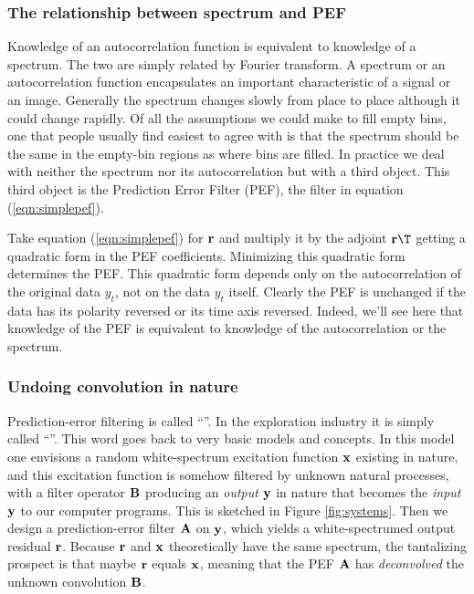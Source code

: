 \subsubsection{The relationship between spectrum and PEF}
Knowledge of an autocorrelation function
is equivalent to knowledge of a spectrum.
The two are simply related by Fourier transform.
A spectrum or an autocorrelation function encapsulates
an important characteristic of a signal or an image.
Generally the spectrum changes slowly from place to place
although it could change rapidly.
Of all the assumptions we could make to fill empty bins,
one that people usually find easiest to agree with is that
the spectrum should be the same
in the empty-bin regions as where bins are filled.
In practice we deal with neither the spectrum
nor its autocorrelation but with a third object.
This third object is the Prediction Error Filter (PEF),
the filter in equation (\ref{eqn:simplepef}).

\par
Take equation  (\ref{eqn:simplepef}) for $\bold r$ and multiply it
by the adjoint $\bold r\T$ getting a quadratic form in the PEF
coefficients.  Minimizing this quadratic form determines the PEF.
This quadratic form depends only on the autocorrelation
of the original data $y_t$, not on the data $y_t$ itself.
Clearly the PEF is unchanged if the data has its polarity reversed
or its time axis reversed.
Indeed, we'll see here that knowledge of the PEF
is equivalent to knowledge of the autocorrelation or the spectrum.


\subsubsection{Undoing convolution in nature}
Prediction-error filtering is called
``''.
In the exploration industry it is simply called ``''.
This word goes back to very basic models and concepts.
In this model one envisions
a random white-spectrum excitation function $\bold x$
existing in nature, and this excitation function
is somehow filtered by unknown natural processes,
with a filter operator $\bold B$
producing an {\it output} $\bold y$ in nature
that becomes the {\it input} $\bold y$
to our computer programs.
This is sketched in Figure \ref{fig:systems}.
Then we design a prediction-error filter $\bold A$ on $\bold y$,
which yields a white-spectrumed output residual $\bold r$.
Because $\bold r$ and $\bold x$ theoretically have the same spectrum,
the tantalizing prospect is that maybe $\bold r$ equals $\bold x$,
meaning that the PEF $\bold A$ has {\it deconvolved}
the unknown convolution $\bold B$.

